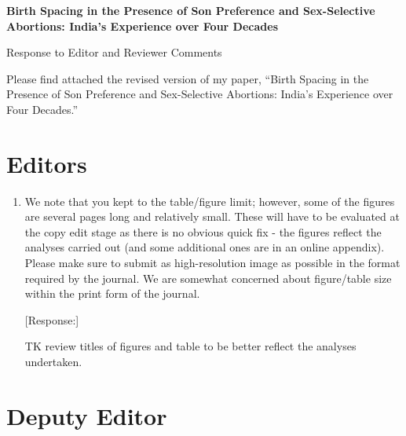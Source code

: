 \documentclass[letterpaper,12pt]{article}
\title{} \author{}
\begin{document}
\begin{center} \textbf{\large Birth Spacing in the Presence of Son
Preference and 
Sex-Selective Abortions: India's Experience over Four Decades}
\end{center}

\begin{center} Response to Editor and Reviewer Comments \end{center}

\noindent Please find attached the revised version of my paper,
``Birth Spacing in the Presence of Son Preference and Sex-Selective
Abortions:
India's Experience over Four Decades.''


\section*{Editors}

\begin{enumerate}

\item We note that you kept to the table/figure limit; however, some of
the figures are several pages long and relatively small. These will have
to be evaluated at the copy edit stage as there is no obvious quick fix
- the figures reflect the analyses carried out (and some additional ones
are in an online appendix). Please make sure to submit as
high-resolution image as possible in the format required by the journal.
We are somewhat concerned about figure/table size within the print form
of the journal.

[Response:]

TK review titles of figures and table to be better reflect the
analyses undertaken.


\end{enumerate}


\section*{Deputy Editor}
\end{document}

